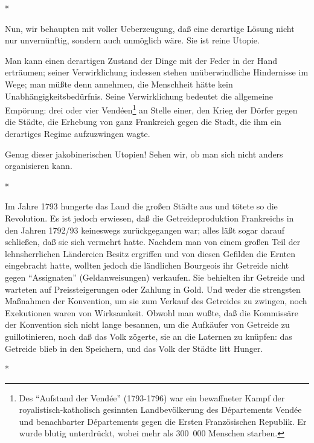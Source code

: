 \documentclass{scrbook}
\begin{document}
\begin{center}*\end{center}

Nun, wir behaupten mit voller Ueberzeugung, daß eine derartige Lösung nicht nur unvernünftig, sondern auch unmöglich wäre. Sie ist reine Utopie.

Man kann einen derartigen Zustand der Dinge mit der Feder in der Hand erträumen; seiner Verwirklichung indessen stehen unüberwindliche Hindernisse im Wege; man müßte denn annehmen, die Menschheit hätte kein Unabhängigkeitsbedürfnis. Seine Verwirklichung bedeutet die allgemeine Empörung: drei oder vier Vendéen\footnote{Des ``Aufstand der Vendée'' (1793-1796) war ein bewaffneter Kampf der royalistisch-katholisch gesinnten Landbevölkerung des Départements Vendée und benachbarter Départements gegen die Ersten Französischen Republik. Er wurde blutig unterdrückt, wobei mehr als 300~000 Menschen starben.} an Stelle einer, den Krieg der Dörfer gegen die Städte, die Erhebung von ganz Frankreich gegen die Stadt, die ihm ein derartiges Regime aufzuzwingen wagte.

Genug dieser jakobinerischen Utopien! Sehen wir, ob man sich nicht anders organisieren kann.

\begin{center}*\end{center}

Im Jahre 1793 hungerte das Land die großen Städte aus und tötete so die Revolution. Es ist jedoch erwiesen, daß die Getreideproduktion Frankreichs in den Jahren 1792/93 keineswegs zurückgegangen war; alles läßt sogar darauf schließen, daß sie sich vermehrt hatte. Nachdem man von einem großen Teil der lehnsherrlichen Ländereien Besitz ergriffen und von diesen Gefilden die Ernten eingebracht hatte, wollten jedoch die ländlichen Bourgeois ihr Getreide nicht gegen ``Assignaten'' (Geldanweisungen) verkaufen. Sie behielten ihr Getreide und warteten auf Preissteigerungen oder Zahlung in Gold. Und weder die strengsten Maßnahmen der Konvention, um sie zum Verkauf des Getreides zu zwingen, noch Exekutionen waren von Wirksamkeit. Obwohl man wußte, daß die Kommissäre der Konvention sich nicht lange besannen, um die Aufkäufer von Getreide zu guillotinieren, noch daß das Volk zögerte, sie an die Laternen zu knüpfen: das Getreide blieb in den Speichern, und das Volk der Städte litt Hunger.

\begin{center}*\end{center}
\end{document}
